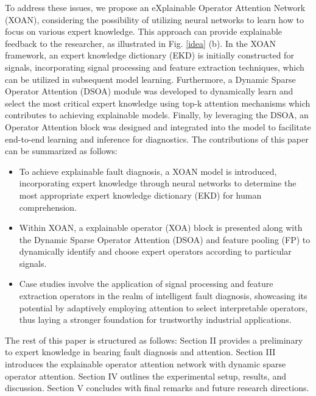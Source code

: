 \documentclass[lettersize,journal]{IEEEtran}
\begin{document}
To address these issues, we propose an eXplainable Operator Attention Network (XOAN), considering the possibility of utilizing neural networks to learn how to focus on various expert knowledge. This approach can provide explainable feedback to the researcher, as illustrated in Fig. \ref{idea} (b). In the XOAN framework, an expert knowledge dictionary (EKD) is initially constructed for signals, incorporating signal processing and feature extraction techniques, which can be utilized in subsequent model learning. Furthermore, a Dynamic Sparse Operator Attention (DSOA) module was developed to dynamically learn and select the most critical expert knowledge using top-k attention mechanisms which contributes to achieving explainable models. Finally, by leveraging the DSOA, an Operator Attention block was designed and integrated into the model to facilitate end-to-end learning and inference for diagnostics. 
The contributions of this paper can be summarized as follows: 
\begin{itemize}
    \item   To achieve explainable fault diagnosis,  a XOAN model is introduced, incorporating expert knowledge through neural networks to determine the most appropriate expert knowledge dictionary (EKD) for human comprehension.
    \item   Within XOAN, a explainable operator (XOA) block is presented along with the Dynamic Sparse Operator Attention (DSOA) and feature pooling (FP) to dynamically identify and choose expert operators according to particular signals.
    \item Case studies involve the application of signal processing and feature extraction operators in the realm of intelligent fault diagnosis, showcasing its potential by adaptively employing attention to select interpretable operators, thus laying a stronger foundation for trustworthy industrial applications. 

 
\end{itemize}

The rest of this paper is structured as follows: Section II provides a preliminary to expert knowledge in bearing fault diagnosis and attention. Section III introduces the explainable operator attention network with dynamic sparse operator attention. Section IV outlines the experimental setup, results, and discussion. Section V concludes with final remarks and future research directions.
\end{document}

